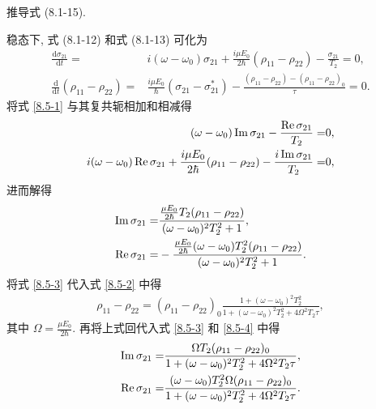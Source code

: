 \documentclass[twoside]{note}
\begin{document}
\begin{exe}
    推导式 (8.1-15).
\end{exe}
\begin{pf}
    稳态下, 式 (8.1-12) 和式 (8.1-13) 可化为
    \begin{align}
        \label{8.5-1}
        \frac{\mathrm{d}\sigma_{21}}{\mathrm{d}t}=&i(\omega-\omega_0)\sigma_{21}+\frac{i\mu E_0}{2\hbar}(\rho_{11}-\rho_{22})-\frac{\sigma_{21}}{T_2}=0,\\
        \label{8.5-2}
        \frac{\mathrm{d}}{\mathrm{d}t}(\rho_{11}-\rho_{22})=&\frac{i\mu E_0}{\hbar}(\sigma_{21}-\sigma_{21}^*)-\frac{(\rho_{11}-\rho_{22})-(\rho_{11}-\rho_{22})_0}{\tau}=0.
    \end{align}
    将式 \eqref{8.5-1} 与其复共轭相加和相减得
    \begin{align}
        (\omega-\omega_0)\operatorname{Im}\sigma_{21}-\frac{\operatorname{Re}\sigma_{21}}{T_2}=&0,\\
        i(\omega-\omega_0)\operatorname{Re}\sigma_{21}+\frac{i\mu E_0}{2\hbar}(\rho_{11}-\rho_{22})-\frac{i\operatorname{Im}\sigma_{21}}{T_2}=&0,
    \end{align}
    进而解得
    \begin{align}
        \label{8.5-3}
        \operatorname{Im}\sigma_{21}=&\frac{\frac{\mu E_0}{2\hbar}T_2(\rho_{11}-\rho_{22})}{(\omega-\omega_0)^2T_2^2+1},\\
        \label{8.5-4}
        \operatorname{Re}\sigma_{21}=&-\frac{\frac{\mu E_0}{2\hbar}(\omega-\omega_0)T_2^2(\rho_{11}-\rho_{22})}{(\omega-\omega_0)^2T_2^2+1}.
    \end{align}
    将式 \eqref{8.5-3} 代入式 \eqref{8.5-2} 中得
    \begin{align}
        \rho_{11}-\rho_{22}=(\rho_{11}-\rho_{22})_0\frac{1+(\omega-\omega_0)^2T_2^2}{1+(\omega-\omega_0)^2T_2^2+4\Omega^2T_2\tau},
    \end{align}
    其中 $\Omega=\frac{\mu E_0}{2\hbar}$.
    再将上式回代入式 \eqref{8.5-3} 和 \eqref{8.5-4} 中得
    \begin{align}
        \operatorname{Im}\sigma_{21}=&\frac{\Omega T_2(\rho_{11}-\rho_{22})_0}{1+(\omega-\omega_0)^2T_2^2+4\Omega^2T_2\tau},\\
        \operatorname{Re}\sigma_{21}=&\frac{(\omega-\omega_0)T_2^2\Omega(\rho_{11}-\rho_{22})_0}{1+(\omega-\omega_0)^2T_2^2+4\Omega^2T_2\tau}.
    \end{align}
\end{pf}
\end{document}
